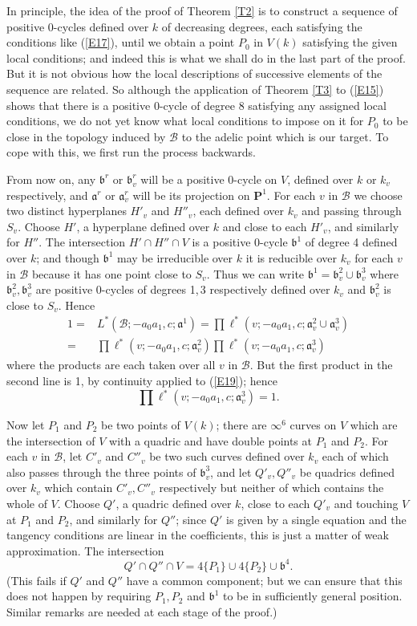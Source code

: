 \documentclass[12pt]{article}
\def\bP{{\mathbf P}}
\def\fa{{\mathfrak a}}
\def\fb{{\mathfrak b}}
\def\sB{{\mathcal B}}
\def\beq{\begin{equation} \label}
\begin{document}
In principle, the idea of the proof of Theorem \ref{T2} is to construct
a sequence
of positive 0-cycles defined over $k$ of decreasing degrees, each satisfying
the conditions like (\ref{E17}), until we obtain a
point $P_0$ in $V(k)$ satisfying the given local conditions; and
indeed this is what we shall do in the last part of the proof. But it is not
obvious how the local descriptions of successive elements of the sequence are
related. So although the application of Theorem \ref{T3} to (\ref{E15}) shows
that there is a positive 0-cycle of degree 8 satisfying any assigned
local conditions, we do not yet know what local conditions to impose on it for
$P_0$ to be close in the topology induced by $\sB$ to the adelic point which
is our target. To cope with this, we first run the process backwards.

{From} now on, any $\fb^r$ or $\fb^r_v$ will be a positive 0-cycle on $V$,
defined over $k$ or $k_v$ respectively, and $\fa^r$ or $\fa^r_v$ will be its
projection on $\bP^1$.
For each $v$ in $\sB$ we choose two distinct hyperplanes $H'_v$ and $H''_v$,
each defined over $k_v$ and passing through $S_v$. Choose $H'$, a hyperplane
defined over $k$ and close to each $H'_v$, and similarly for $H''$. The
intersection $H'\cap H''\cap V$ is a positive 0-cycle $\fb^1$ of degree 4
defined over
$k$; and though $\fb^1$ may be irreducible over $k$ it is reducible over $k_v$
for each $v$ in $\sB$ because it has one point close to $S_v$. Thus we can
write $\fb^1=\fb^2_v\cup\fb^3_v$ where $\fb^2_v,\fb^3_v$ are positive 0-cycles
of
degrees 1,\,3 respectively defined over $k_v$ and $\fb_v^2$ is close to $S_v$.
Hence
\begin{align*}
1= & L^*(\sB;-a_0a_1,c;\fa^1) = \prod\ell^*(v;-a_0a_1,c;\fa^2_v\cup\fa^3_v) \\
 = & \prod\ell^*(v;-a_0a_1,c;\fa^2_v)\prod\ell^*(v;-a_0a_1,c;\fa^3_v)
\end{align*}
where the products are each taken over all $v$ in $\sB$. But the first product
in the second line is 1, by continuity applied to (\ref{E19}); hence
\beq{E30} \prod\ell^*(v;-a_0a_1,c;\fa^3_v)=1. \end{equation}

Now let $P_1$ and $P_2$ be two points of $V(k)$; there are $\infty^6$
curves on $V$ which are the intersection of $V$ with a quadric and have double
points at $P_1$ and $P_2$. For each $v$ in $\sB$, let $C'_v$ and $C''_v$ be
two such curves defined over $k_v$ each of which also passes through the three
points of $\fb^3_v$, and let $Q'_v,Q''_v$ be quadrics defined over $k_v$ which
contain $C'_v,C''_v$ respectively but neither of which contains the whole of
$V$. Choose $Q'$, a quadric defined over $k$, close to each $Q'_v$ and touching
$V$ at $P_1$ and $P_2$, and similarly for $Q''$; since $Q'$ is given by a
single equation and the tangency conditions are linear in the coefficients,
this is just a matter of weak approximation. The intersection
\[ Q'\cap Q''\cap V=4\{P_1\}\cup4\{P_2\}\cup\fb^4. \]
(This fails if $Q'$ and $Q''$ have a common component; but we can ensure that
this does not happen by requiring $P_1,P_2$ and $\fb^1$ to be in sufficiently
general position. Similar remarks are needed at each stage of the proof.)
\end{document}
